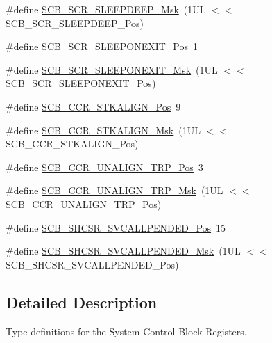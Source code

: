 \begin{DoxyCompactItemize}
\#define \mbox{\hyperlink{group___c_m_s_i_s___s_c_b_ga77c06a69c63f4b3f6ec1032e911e18e7}{S\+C\+B\+\_\+\+S\+C\+R\+\_\+\+S\+L\+E\+E\+P\+D\+E\+E\+P\+\_\+\+Msk}}~(1\+U\+L $<$$<$ S\+C\+B\+\_\+\+S\+C\+R\+\_\+\+S\+L\+E\+E\+P\+D\+E\+E\+P\+\_\+\+Pos)
\item 
\#define \mbox{\hyperlink{group___c_m_s_i_s___s_c_b_ga3680a15114d7fdc1e25043b881308fe9}{S\+C\+B\+\_\+\+S\+C\+R\+\_\+\+S\+L\+E\+E\+P\+O\+N\+E\+X\+I\+T\+\_\+\+Pos}}~1
\item 
\#define \mbox{\hyperlink{group___c_m_s_i_s___s_c_b_ga50a243e317b9a70781b02758d45b05ee}{S\+C\+B\+\_\+\+S\+C\+R\+\_\+\+S\+L\+E\+E\+P\+O\+N\+E\+X\+I\+T\+\_\+\+Msk}}~(1\+U\+L $<$$<$ S\+C\+B\+\_\+\+S\+C\+R\+\_\+\+S\+L\+E\+E\+P\+O\+N\+E\+X\+I\+T\+\_\+\+Pos)
\item 
\#define \mbox{\hyperlink{group___c_m_s_i_s___s_c_b_gac2d20a250960a432cc74da59d20e2f86}{S\+C\+B\+\_\+\+C\+C\+R\+\_\+\+S\+T\+K\+A\+L\+I\+G\+N\+\_\+\+Pos}}~9
\item 
\#define \mbox{\hyperlink{group___c_m_s_i_s___s_c_b_ga33cf22d3d46af158a03aad25ddea1bcb}{S\+C\+B\+\_\+\+C\+C\+R\+\_\+\+S\+T\+K\+A\+L\+I\+G\+N\+\_\+\+Msk}}~(1\+U\+L $<$$<$ S\+C\+B\+\_\+\+C\+C\+R\+\_\+\+S\+T\+K\+A\+L\+I\+G\+N\+\_\+\+Pos)
\item 
\#define \mbox{\hyperlink{group___c_m_s_i_s___s_c_b_gac4e4928b864ea10fc24dbbc57d976229}{S\+C\+B\+\_\+\+C\+C\+R\+\_\+\+U\+N\+A\+L\+I\+G\+N\+\_\+\+T\+R\+P\+\_\+\+Pos}}~3
\item 
\#define \mbox{\hyperlink{group___c_m_s_i_s___s_c_b_ga68c96ad594af70c007923979085c99e0}{S\+C\+B\+\_\+\+C\+C\+R\+\_\+\+U\+N\+A\+L\+I\+G\+N\+\_\+\+T\+R\+P\+\_\+\+Msk}}~(1\+U\+L $<$$<$ S\+C\+B\+\_\+\+C\+C\+R\+\_\+\+U\+N\+A\+L\+I\+G\+N\+\_\+\+T\+R\+P\+\_\+\+Pos)
\item 
\#define \mbox{\hyperlink{group___c_m_s_i_s___s_c_b_ga2f93ec9b243f94cdd3e94b8f0bf43641}{S\+C\+B\+\_\+\+S\+H\+C\+S\+R\+\_\+\+S\+V\+C\+A\+L\+L\+P\+E\+N\+D\+E\+D\+\_\+\+Pos}}~15
\item 
\#define \mbox{\hyperlink{group___c_m_s_i_s___s_c_b_ga6095a7acfbad66f52822b1392be88652}{S\+C\+B\+\_\+\+S\+H\+C\+S\+R\+\_\+\+S\+V\+C\+A\+L\+L\+P\+E\+N\+D\+E\+D\+\_\+\+Msk}}~(1\+U\+L $<$$<$ S\+C\+B\+\_\+\+S\+H\+C\+S\+R\+\_\+\+S\+V\+C\+A\+L\+L\+P\+E\+N\+D\+E\+D\+\_\+\+Pos)
\end{DoxyCompactItemize}


\subsection{Detailed Description}
Type definitions for the System Control Block Registers. 



